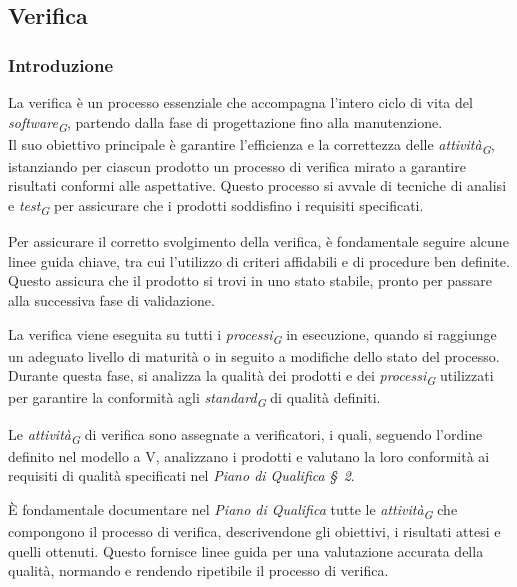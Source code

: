 \subsection{Verifica}
\label{subsec:verifica}

\subsubsection{Introduzione}
La verifica è un processo essenziale che accompagna l'intero ciclo di vita del \textit{software}\textsubscript{\textit{G}}, partendo dalla fase di progettazione fino alla manutenzione. \\
Il suo obiettivo principale è garantire l'efficienza e la correttezza delle \textit{attività}\textsubscript{\textit{G}}, istanziando per ciascun prodotto un processo di verifica mirato a garantire risultati conformi alle aspettative. Questo processo si avvale di tecniche di analisi e \textit{test}\textsubscript{\textit{G}} per assicurare che i prodotti soddisfino i requisiti specificati.

\vspace{0.2cm}

Per assicurare il corretto svolgimento della verifica, è fondamentale seguire alcune linee guida chiave, tra cui l'utilizzo di criteri affidabili e di procedure ben definite. Questo assicura che il prodotto si trovi in uno stato stabile, pronto per passare alla successiva fase di validazione.

\vspace{0.2cm}

La verifica viene eseguita su tutti i \textit{processi}\textsubscript{\textit{G}} in esecuzione, quando si raggiunge un adeguato livello di maturità o in seguito a modifiche dello stato del processo. Durante questa fase, si analizza la qualità dei prodotti e dei \textit{processi}\textsubscript{\textit{G}} utilizzati per garantire la conformità agli \textit{standard}\textsubscript{\textit{G}} di qualità definiti.

\vspace{0.2cm}

Le \textit{attività}\textsubscript{\textit{G}} di verifica sono assegnate a verificatori, i quali, seguendo l'ordine definito nel modello a V, analizzano i prodotti e valutano la loro conformità ai requisiti di qualità specificati nel \textit{Piano di Qualifica \S~2}.

\vspace{0.2cm}

È fondamentale documentare nel \textit{Piano di Qualifica} tutte le \textit{attività}\textsubscript{\textit{G}} che compongono il processo di verifica, descrivendone gli obiettivi, i risultati attesi e quelli ottenuti. Questo fornisce linee guida per una valutazione accurata della qualità, normando e rendendo ripetibile il processo di verifica.

